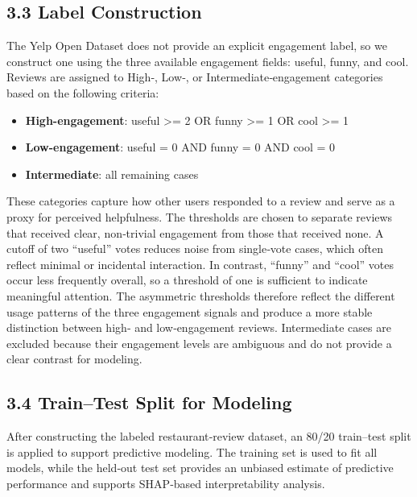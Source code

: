 \hypertarget{label-construction}{%
\subsection{3.3 Label Construction}\label{label-construction}}

The Yelp Open Dataset does not provide an explicit engagement label, so
we construct one using the three available engagement fields: useful,
funny, and cool. Reviews are assigned to High‑, Low‑, or
Intermediate‑engagement categories based on the following criteria:

\begin{itemize}  
\item \textbf{High-engagement}: useful >= 2 OR funny >= 1 OR cool >= 1
\item \textbf{Low-engagement}: useful = 0 AND funny = 0 AND cool = 0  
\item \textbf{Intermediate}: all remaining cases  
\end{itemize}

These categories capture how other users responded to a review and serve
as a proxy for perceived helpfulness. The thresholds are chosen to
separate reviews that received clear, non‑trivial engagement from those
that received none. A cutoff of two ``useful'' votes reduces noise from
single‑vote cases, which often reflect minimal or incidental
interaction. In contrast, ``funny'' and ``cool'' votes occur less
frequently overall, so a threshold of one is sufficient to indicate
meaningful attention. The asymmetric thresholds therefore reflect the
different usage patterns of the three engagement signals and produce a
more stable distinction between high‑ and low‑engagement reviews.
Intermediate cases are excluded because their engagement levels are
ambiguous and do not provide a clear contrast for modeling.

\hypertarget{traintest-split-for-modeling}{%
\subsection{3.4 Train--Test Split for
Modeling}\label{traintest-split-for-modeling}}

After constructing the labeled restaurant‑review dataset, an 80/20
train--test split is applied to support predictive modeling. The
training set is used to fit all models, while the held‑out test set
provides an unbiased estimate of predictive performance and supports
SHAP‑based interpretability analysis.

